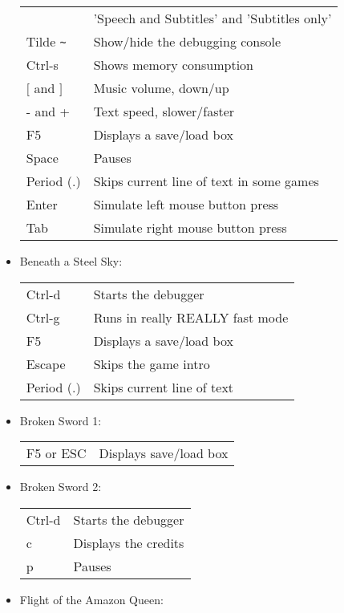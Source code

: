 \begin{itemize}
\begin{tabular}{ll}
                           & 'Speech and Subtitles' and 'Subtitles only'\\
    Tilde \verb#~#         & Show/hide the debugging console\\
    Ctrl-s                 & Shows memory consumption\\
    $[$ and $]$                & Music volume, down/up\\
    - and +                & Text speed, slower/faster\\
    F5                     & Displays a save/load box\\
    Space                  & Pauses\\
    Period (.)             & Skips current line of text in some games\\
    Enter                  & Simulate left mouse button press\\
    Tab                    & Simulate right mouse button press\\
  \end{tabular}
\item Beneath a Steel Sky:\\
  \begin{tabular}{ll}
    Ctrl-d                 & Starts the debugger\\
    Ctrl-g                 & Runs in really REALLY fast mode\\
    F5                     & Displays a save/load box\\
    Escape                 & Skips the game intro\\
    Period (.)             & Skips current line of text\\
  \end{tabular}
\item Broken Sword 1:\\
  \begin{tabular}{ll}
    F5 or ESC              & Displays save/load box\\
  \end{tabular}
\item Broken Sword 2:\\
  \begin{tabular}{ll}
    Ctrl-d                 & Starts the debugger\\
    c                      & Displays the credits\\
    p                      & Pauses\\
  \end{tabular}
\item Flight of the Amazon Queen:\\

\end{itemize}
